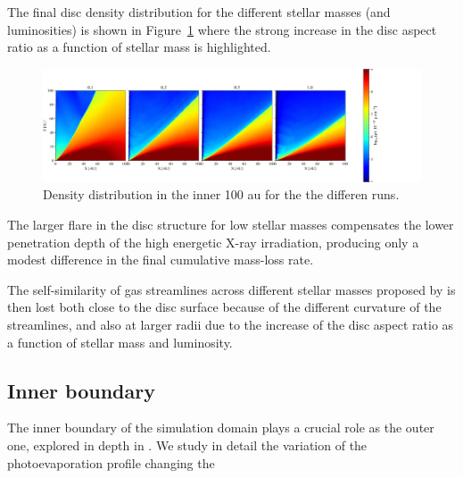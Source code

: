 \documentclass{aa}
\begin{document}
The final disc density distribution for the different stellar masses (and luminosities) is shown in Figure~\ref{fig:discs} where the strong increase in the disc aspect ratio as a function of stellar mass is highlighted.
\begin{figure}
    \centering
    \includegraphics[width=\textwidth]{disc}
    \caption{Density distribution in the inner 100 au for the the differen runs. \label{fig:discs}}
\end{figure}
The larger flare in the disc structure for low stellar masses compensates the lower penetration depth of the high energetic X-ray irradiation, producing only a modest difference in the final cumulative mass-loss rate.

The self-similarity of gas streamlines across different stellar masses proposed by
 is then lost both close to the disc surface because of the different curvature of the streamlines, and also at larger radii due to the increase of the disc aspect ratio as a function of stellar mass and luminosity.


\subsection{Inner boundary}\label{sec:inner-boundary}

The inner boundary of the simulation domain plays a crucial role as the outer one, explored in depth in \citep{2019MNRAS.487..691P}. We study in detail the variation of the photoevaporation profile changing the

\end{document}
